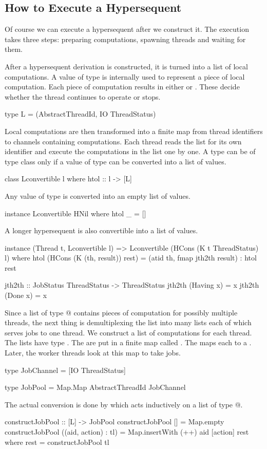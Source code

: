 \subsection{How to Execute a Hypersequent}
Of course we can execute a hypersequent after we construct it.  The
execution takes three steps: preparing computations, spawning
threads and waiting for them.

After a hypersequent derivation is constructed, it is turned into a list
of local computations.  A value of type \verb@L@ is internally used to
represent a piece of
local computation.  Each piece of computation results in either \verb@TryAnotherJob@
or \verb@Finished@.  These decide whether the thread continues to operate or stops.
\begin{code}
type L = (AbstractThreadId, IO ThreadStatus)
\end{code}

Local computations are then transformed into a finite map from thread
identifiers to channels containing computations. Each thread reads the list for
its own identifier and execute the computations in the list one by one.
A type \verb@l@ can be of type class \verb@Lconvertible@ only if
a value of type \verb@l@ can be converted into a list of \verb@L@
values.
\begin{code}
class Lconvertible l where
    htol :: l -> [L]
\end{code}
Any value of type \verb@HNil@ is converted into an empty list of
\verb@L@ values.
\begin{code}
instance Lconvertible HNil where
    htol _ = []
\end{code}
A longer hypersequent is also convertible into a list of \verb@L@ values.
\begin{code}
instance (Thread t, Lconvertible l) =>
 Lconvertible (HCons (K t ThreadStatus) l) where
    htol (HCons (K (th, result)) rest) =
      (atid th, fmap jth2th result) : htol rest

jth2th :: JobStatus ThreadStatus -> ThreadStatus
jth2th (Having x) = x
jth2th (Done x) = x
\end{code}

Since a list of type \verb@[L]@ contains pieces of computation for
possibly multiple threads, the next thing is demultiplexing the list
into many lists each of which serves jobs to one thread.
We construct a list of computations for each thread.  The lists have type
\verb@JobChannel@.  The \verb@JobChannel@s are put in a finite map called
\verb@JobPool@.  The \verb@JobPool@ maps each \verb@AbstractThreadId@ to a
\verb@JobChannel@.  Later, the worker threads look at this map to take
jobs.
\begin{code}
type JobChannel = [IO ThreadStatus]

type JobPool =
    Map.Map AbstractThreadId JobChannel
\end{code}
The actual conversion is done by \verb@constructJobPool@ which acts
inductively on a list of type \verb@[L]@.
\begin{code}
constructJobPool :: [L] -> JobPool
constructJobPool [] = Map.empty
constructJobPool ((aid, action) : tl) =
  Map.insertWith (++) aid [action] rest
     where rest = constructJobPool tl
\end{code}

